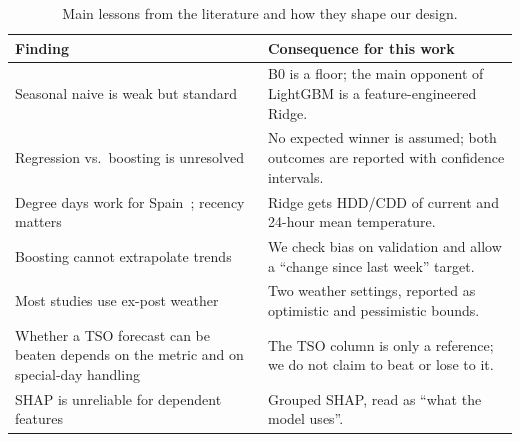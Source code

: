 \begin{table}[H]
  \centering
  \small
  \caption{Main lessons from the literature and how they shape our design.}
  \label{tab:lit-summary}
  \begin{tabularx}{\linewidth}{@{}Y Y@{}}
    \toprule
    Finding & Consequence for this work \\
    \midrule
    Seasonal naive is weak but standard~\cite{wang2016recency,smyl2023esdrnn}
      & B0 is a floor; the main opponent of LightGBM is a feature-engineered Ridge. \\
    Regression vs.\ boosting is unresolved~\cite{charlton2014refined,lloyd2014gefcom}
      & No expected winner is assumed; both outcomes are reported with confidence intervals. \\
    Degree days work for Spain~\cite{pardo2002temperature}; recency matters~\cite{wang2016recency}
      & Ridge gets HDD/CDD of current and 24-hour mean temperature. \\
    Boosting cannot extrapolate trends~\cite{rubattu2023electricity}
      & We check bias on validation and allow a ``change since last week'' target. \\
    Most studies use ex-post weather~\cite{hyndman2021fpp3}
      & Two weather settings, reported as optimistic and pessimistic bounds. \\
    Whether a TSO forecast can be beaten depends on the metric and on special-day
      handling~\cite{mobius2023better,incremona2021italian}
      & The TSO column is only a reference; we do not claim to beat or lose to it. \\
    SHAP is unreliable for dependent features~\cite{aas2021explaining,chen2020true}
      & Grouped SHAP, read as ``what the model uses''. \\
    \bottomrule
  \end{tabularx}
\end{table}
